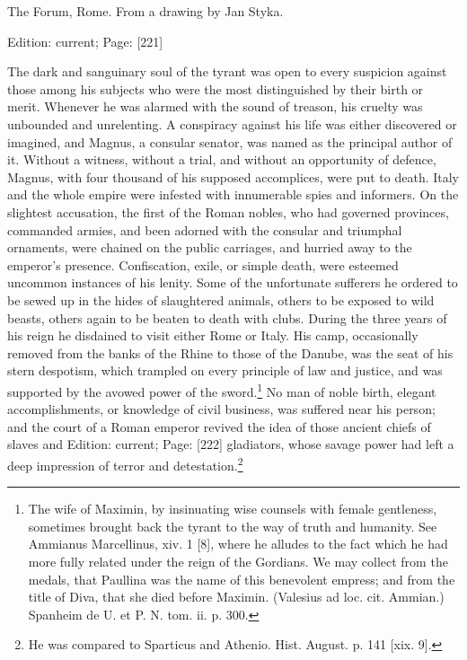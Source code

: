 The Forum, Rome. From a drawing by Jan Styka.

Edition: current; Page: [221]

The dark and sanguinary soul of the tyrant was open to every suspicion against those among his subjects who were the most distinguished by their birth or merit. Whenever he was alarmed with the sound of treason, his cruelty was unbounded and unrelenting. A conspiracy against his life was either discovered or imagined, and Magnus, a consular senator, was named as the principal author of it. Without a witness, without a trial, and without an opportunity of defence, Magnus, with four thousand of his supposed accomplices, were put to death. Italy and the whole empire were infested with innumerable spies and informers. On the slightest accusation, the first of the Roman nobles, who had governed provinces, commanded armies, and been adorned with the consular and triumphal ornaments, were chained on the public carriages, and hurried away to the emperor\texthebrew{}’s presence. Confiscation, exile, or simple death, were esteemed uncommon instances of his lenity. Some of the unfortunate sufferers he ordered to be sewed up in the hides of slaughtered animals, others to be exposed to wild beasts, others again to be beaten to death with clubs. During the three years of his reign he disdained to visit either Rome or Italy. His camp, occasionally removed from the banks of the Rhine to those of the Danube, was the seat of his stern despotism, which trampled on every principle of law and justice, and was supported by the avowed power of the sword.\footnote{The wife of Maximin, by insinuating wise counsels with female gentleness, sometimes brought back the tyrant to the way of truth and humanity. See Ammianus Marcellinus, xiv. 1 [8], where he alludes to the fact which he had more fully related under the reign of the Gordians. We may collect from the medals, that Paullina was the name of this benevolent empress; and from the title of Diva, that she died before Maximin. (Valesius ad loc. cit. Ammian.) Spanheim de U. et P. N. tom. ii. p. 300.} No man of noble birth, elegant accomplishments, or knowledge of civil business, was suffered near his person; and the court of a Roman emperor revived the idea of those ancient chiefs of slaves and Edition: current; Page: [222] gladiators, whose savage power had left a deep impression of terror and detestation.\footnote{He was compared to Sparticus and Athenio. Hist. August. p. 141 [xix. 9].}

